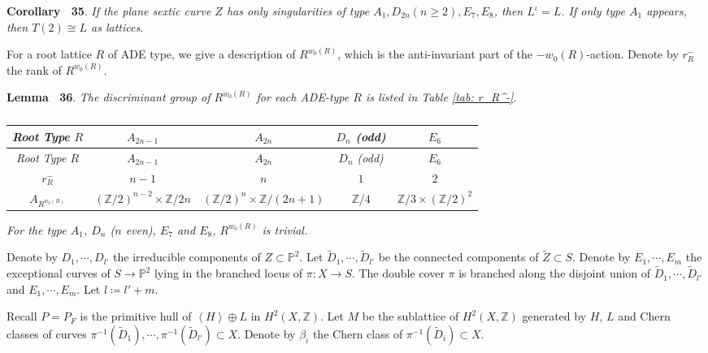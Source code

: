 \documentclass[
]{article}
\begin{document}
\label{table: m_R}

\textbf{Corollary~ 35}. \emph{\label{cor: if only A_1,D_2n,E_7,E_8} If
the plane sextic curve \(Z\) has only singularities of type
\(A_1,D_{2n}(n\ge 2),E_7,E_8\), then \(L^\iota=L\). If only type \(A_1\)
appears, then \(T(2)\cong L\) as lattices.}

For a root lattice \(R\) of ADE type, we give a description of
\(R^{w_0(R)}\), which is the anti-invariant part of the
\(-w_0(R)\)-action. Denote by \(r_R^-\) the rank of \(R^{w_0(R)}\).

\textbf{Lemma~ 36}. \emph{\label{lem: anti-inv} The discriminant group
of \(R^{w_0(R)}\) for each ADE-type \(R\) is listed in Table
\ref{tab: r_R^-}.}

\emph{\centering    }

\begin{longtable}[]{@{}ccccc@{}}
\caption{\emph{}}\tabularnewline
\toprule\noalign{}
\emph{Root Type \(R\)} & \emph{\(A_{2n-1}\)} & \emph{\(A_{2n}\)} &
\emph{\(D_{n}\) (odd)} & \emph{\(E_6\)} \\
\midrule\noalign{}
\endfirsthead
\toprule\noalign{}
\emph{Root Type \(R\)} & \emph{\(A_{2n-1}\)} & \emph{\(A_{2n}\)} &
\emph{\(D_{n}\) (odd)} & \emph{\(E_6\)} \\
\midrule\noalign{}
\endhead
\bottomrule\noalign{}
\endlastfoot
\emph{\(r_R^-\)} & \emph{\(n-1\)} & \emph{\(n\)} & \emph{\(1\)} &
\emph{\(2\)} \\
\emph{\(A_{R^{w_0(R)}}\)} &
\emph{\((\mathbb{Z}/2)^{n-2}\times \mathbb{Z}/2n\)} &
\emph{\((\mathbb{Z}/2)^n\times \mathbb{Z}/(2n+1)\)} &
\emph{\(\mathbb{Z}/4\)} &
\emph{\(\mathbb{Z}/3\times(\mathbb{Z}/2)^2\)} \\
\end{longtable}

\emph{\label{tab: r_R^-}}

\emph{For the type \(A_1\), \(D_n\) (\(n\) even), \(E_7\) and \(E_8\),
\(R^{w_0(R)}\) is trivial.}

Denote by \(D_1,\cdots,D_{l'}\) the irreducible components of
\(Z\subset \mathbb{P}^2\). Let
\(\widetilde{D}_1,\cdots,\widetilde{D}_{l'}\) be the connected
components of \(\widetilde{Z}\subset S\). Denote by \(E_1,\cdots,E_{m}\)
the exceptional curves of \(S\to \mathbb{P}^2\) lying in the branched
locus of \(\pi\colon X\to S\). The double cover \(\pi\) is branched
along the disjoint union of
\(\widetilde{D}_1,\cdots,\widetilde{D}_{l'}\) and \(E_1,\cdots,E_{m}\).
Let \(l\coloneqq l'+m\).

Recall \(P=P_F\) is the primitive hull of
\(\left\langle H\right\rangle \oplus L\) in \(H^2(X,\mathbb{Z})\). Let
\(M\) be the sublattice of \(H^2(X,\mathbb{Z})\) generated by \(H\),
\(L\) and Chern classes of curves
\(\pi^{-1}(\widetilde{D}_1),\cdots, \pi^{-1}(\widetilde{D}_{l'}) \subset X\).
Denote by \(\beta_i\) the Chern class of
\(\pi^{-1}(\widetilde{D}_i)\subset X\).
\end{document}
